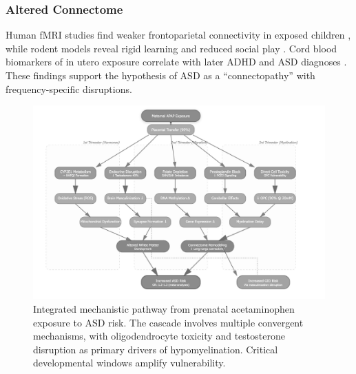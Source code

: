 \documentclass[12pt]{article}
\begin{document}
\subsubsection{Altered Connectome}
Human fMRI studies find weaker frontoparietal connectivity in exposed children \citep{baker2020}, while rodent models reveal rigid learning and reduced social play \citep{blecharz2018,viberg2014}. Cord blood biomarkers of in utero exposure correlate with later ADHD and ASD diagnoses \citep{ji2020}. These findings support the hypothesis of ASD as a ``connectopathy'' with frequency-specific disruptions.

\begin{figure}[h]
\centering
\includegraphics[width=\textwidth]{../assets/MechanisticPathways.jpg}
\caption{Integrated mechanistic pathway from prenatal acetaminophen exposure to ASD risk. The cascade involves multiple convergent mechanisms, with oligodendrocyte toxicity and testosterone disruption as primary drivers of hypomyelination. Critical developmental windows amplify vulnerability.}
\label{fig:pathway}
\end{figure}
\end{document}
